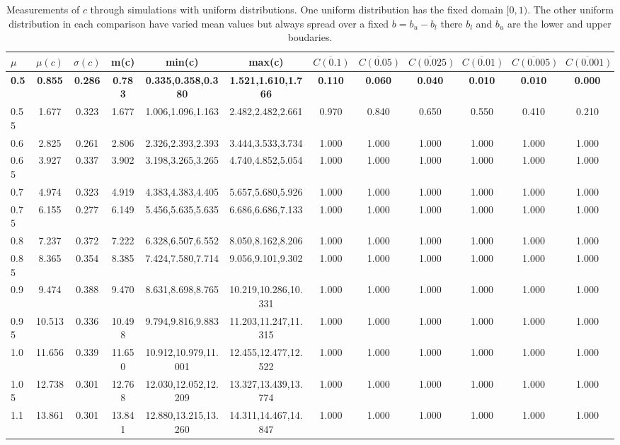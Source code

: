 \begin{table*}[h!]
\begin{center}
\begin{tabular}{| l | c | c | c | c | c | c | c | c | c | c | c |}\hline
$\mu$ & $\mu(c)$ & $\sigma(c)$ & m(c) & min(c) & max(c) & $\overline{C(0.1)}$ & $\overline{C(0.05)}$ & $\overline{C(0.025)}$ & $\overline{C(0.01)}$ & $\overline{C(0.005)}$ & $\overline{C(0.001)}$ \\\hline\hline
{\bf 0.5} & {\bf 0.855} & {\bf 0.286} & {\bf 0.783} & {\bf 0.335,0.358,0.380} & {\bf 1.521,1.610,1.766} & {\bf 0.110} & {\bf 0.060} & {\bf 0.040} & {\bf 0.010} & {\bf 0.010} & {\bf 0.000} \\\hline
0.55 & 1.677 & 0.323 & 1.677 & 1.006,1.096,1.163 & 2.482,2.482,2.661  & 0.970  & 0.840  & 0.650  & 0.550  & 0.410  & 0.210 \\\hline
0.6 & 2.825 & 0.261 & 2.806 & 2.326,2.393,2.393 & 3.444,3.533,3.734  & 1.000  & 1.000  & 1.000  & 1.000  & 1.000  & 1.000 \\\hline
0.65 & 3.927 & 0.337 & 3.902 & 3.198,3.265,3.265 & 4.740,4.852,5.054  & 1.000  & 1.000  & 1.000  & 1.000  & 1.000  & 1.000 \\\hline
0.7 & 4.974 & 0.323 & 4.919 & 4.383,4.383,4.405 & 5.657,5.680,5.926  & 1.000  & 1.000  & 1.000  & 1.000  & 1.000  & 1.000 \\\hline
0.75 & 6.155 & 0.277 & 6.149 & 5.456,5.635,5.635 & 6.686,6.686,7.133  & 1.000  & 1.000  & 1.000  & 1.000  & 1.000  & 1.000 \\\hline
0.8 & 7.237 & 0.372 & 7.222 & 6.328,6.507,6.552 & 8.050,8.162,8.206  & 1.000  & 1.000  & 1.000  & 1.000  & 1.000  & 1.000 \\\hline
0.85 & 8.365 & 0.354 & 8.385 & 7.424,7.580,7.714 & 9.056,9.101,9.302  & 1.000  & 1.000  & 1.000  & 1.000  & 1.000  & 1.000 \\\hline
0.9 & 9.474 & 0.388 & 9.470 & 8.631,8.698,8.765 & 10.219,10.286,10.331  & 1.000  & 1.000  & 1.000  & 1.000  & 1.000  & 1.000 \\\hline
0.95 & 10.513 & 0.336 & 10.498 & 9.794,9.816,9.883 & 11.203,11.247,11.315  & 1.000  & 1.000  & 1.000  & 1.000  & 1.000  & 1.000 \\\hline
1.0 & 11.656 & 0.339 & 11.650 & 10.912,10.979,11.001 & 12.455,12.477,12.522  & 1.000  & 1.000  & 1.000  & 1.000  & 1.000  & 1.000 \\\hline
1.05 & 12.738 & 0.301 & 12.768 & 12.030,12.052,12.209 & 13.327,13.439,13.774  & 1.000  & 1.000  & 1.000  & 1.000  & 1.000  & 1.000 \\\hline
1.1 & 13.861 & 0.301 & 13.841 & 12.880,13.215,13.260 & 14.311,14.467,14.847  & 1.000  & 1.000  & 1.000  & 1.000  & 1.000  & 1.000 \\\hline
\end{tabular}
\caption{Measurements of $c$ through simulations
        with uniform distributions.
        One uniform distribution has the fixed domain $[0,1)$.
        The other uniform distribution in each comparison
        have varied mean values but always
        spread over a fixed $b=b_u-b_l$ there $b_l$ and $b_u$ are the lower and upper boudaries.}
\end{center}
\end{table*}